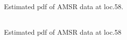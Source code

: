 \begin{figure}[hbp]
  \centering
   \includegraphics[width=0.45]{pdf33.eps} 
  \caption{Estimated pdf of AMSR data at loc.58.}
  \label{fig:pdf33}
\end{figure}

\clearpage

\begin{figure}[hbp]
  \centering
   \includegraphics[width=0.45]{pdf58.eps} 
  \caption{Estimated pdf of AMSR data at loc.58}
  \label{fig:pdf58}
\end{figure}
\clearpage
